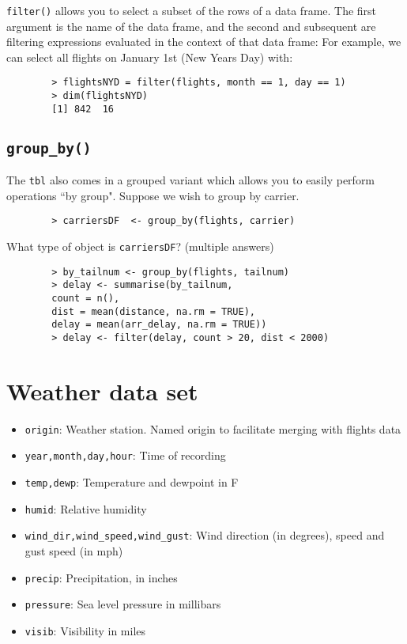 	\texttt{filter()} allows you to select a subset of the rows of a data frame. The first argument is the name of the data frame, and the second and subsequent are filtering expressions evaluated in the context of that data frame:
	For example, we can select all flights on January 1st (New Years Day) with:
	
	\begin{framed}
		\begin{verbatim}
		> flightsNYD = filter(flights, month == 1, day == 1)
		> dim(flightsNYD)
		[1] 842  16
		\end{verbatim}
	\end{framed}
	
	
	
	\subsection{ \texttt{group\_by()}}
	
	The \texttt{tbl} also comes in a grouped variant which allows you to easily perform operations ``by group". Suppose we wish to group by carrier.
	
	\begin{framed}
		\begin{verbatim}
		> carriersDF  <- group_by(flights, carrier)
		\end{verbatim}
	\end{framed}
	
	What type of object is \texttt{carriersDF}? (multiple answers)
	
	\begin{framed}
		\begin{verbatim}
		> by_tailnum <- group_by(flights, tailnum)
		> delay <- summarise(by_tailnum,
		count = n(), 
		dist = mean(distance, na.rm = TRUE),
		delay = mean(arr_delay, na.rm = TRUE))
		> delay <- filter(delay, count > 20, dist < 2000)
		\end{verbatim}
	\end{framed}
	\newpage
	\section{Weather data set}
	\begin{itemize}
		\item \texttt{origin}: Weather station. Named origin to facilitate merging with flights data
		\item \texttt{year,month,day,hour}: Time of recording
		\item \texttt{temp,dewp}: Temperature and dewpoint in F
		\item \texttt{humid}: Relative humidity
		\item \texttt{wind\_dir,wind\_speed,wind\_gust}: Wind direction (in degrees), speed and gust speed (in mph)
		\item \texttt{precip}: Precipitation, in inches
		\item \texttt{pressure}: Sea level pressure in millibars
		\item \texttt{visib}: Visibility in miles
	\end{itemize}
